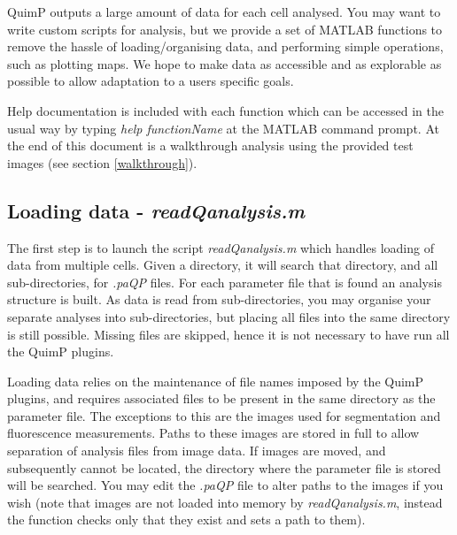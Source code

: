\documentclass[a4paper,12pt]{article}
\begin{document}
\noindent{}

QuimP outputs a large amount of data for each cell analysed.
You may want to write custom scripts for analysis, but we provide
a set of MATLAB functions to remove the hassle of loading/organising data, and performing
simple operations, such as plotting maps.
We hope to make data as accessible and as explorable as possible to allow adaptation to a users specific goals.

Help documentation is included with each function which can be accessed in the
usual way by typing \textit{help functionName} at
the MATLAB command prompt.  At the end of this document is a walkthrough analysis using the provided test images
(see section \ref{walkthrough}).

\subsection{Loading data - \textit{readQanalysis.m}  }

The first step is to launch the script \textit{readQanalysis.m} which handles loading of data from multiple
cells.  Given a directory, it will search that directory, and all sub-directories, for \textit{.paQP} files. For each parameter file
that is found an analysis structure is built.  As data is read from sub-directories, you may organise your separate analyses into 
sub-directories, but placing all files into the same directory is still possible. Missing files are skipped, hence it is not necessary to have run all the QuimP plugins.


Loading data relies on the maintenance
of file names imposed by the QuimP plugins, and requires associated files to
be present in the same directory as the parameter file.
The exceptions to this are the images used for segmentation and fluorescence measurements.  Paths to these images are
stored in full to allow separation of analysis files from image data.  If images are moved, and subsequently cannot
be located, the directory where the parameter file is stored will be searched.  You may edit the \textit{.paQP} file to alter
paths to the images if you wish
(note that images are not loaded into memory by \textit{readQanalysis.m}, instead the function checks only that they exist
and sets a path to them).
\end{document}
